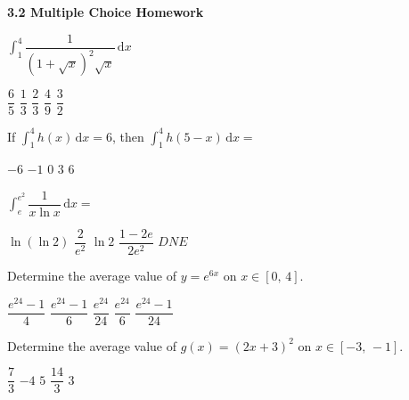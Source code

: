 \textbf{\large{3.2 Multiple Choice Homework}} \par

\begin{questions}
    \question $\int_1^4 \dfrac{1}{\left(1 + \sqrt{x}\right)^2\sqrt{x}} \,\mathrm{d}x$ \\

    \begin{oneparchoices}
        \choice $\dfrac{6}{5}$
        \choice $\dfrac{1}{3}$
        \choice $\dfrac{2}{3}$
        \choice $\dfrac{4}{9}$
        \choice $\dfrac{3}{2}$
    \end{oneparchoices} \par \horizontalline

    \question If $\int_1^4 h(x) \,\mathrm{d}x = 6$, then $\int_1^4 h(5 - x) \,\mathrm{d}x = $ \\

    \begin{oneparchoices}
        \choice $-6$
        \choice $-1$
        \choice $0$
        \choice $3$
        \choice $6$
    \end{oneparchoices} \par \horizontalline

    \question $\int_e^{e^2} \dfrac{1}{x \ln x} \,\mathrm{d}x = $ \\

    \begin{oneparchoices}
        \choice $\ln (\ln 2)$
        \choice $\dfrac{2}{e^2}$
        \choice $\ln 2$
        \choice $\dfrac{1 - 2e}{2e^2}$
        \choice $DNE$
    \end{oneparchoices} \par \horizontalline

    \question Determine the average value of $y = e^{6x}$ on $x \in [0, \, 4]$. \\

    \begin{oneparchoices}
        \choice $\dfrac{e^{24} - 1}{4}$
        \choice $\dfrac{e^{24} - 1}{6}$
        \choice $\dfrac{e^{24}}{24}$
        \choice $\dfrac{e^{24}}{6}$
        \choice $\dfrac{e^{24} - 1}{24}$
    \end{oneparchoices} \par \horizontalline

    \question Determine the average value of $g(x) = (2x + 3)^2$ on $x \in [-3, \, -1]$. \\

    \begin{oneparchoices}
        \choice $\dfrac{7}{3}$
        \choice $-4$
        \choice $5$
        \choice $\dfrac{14}{3}$
        \choice $3$
    \end{oneparchoices} \par \horizontalline


\end{questions}
